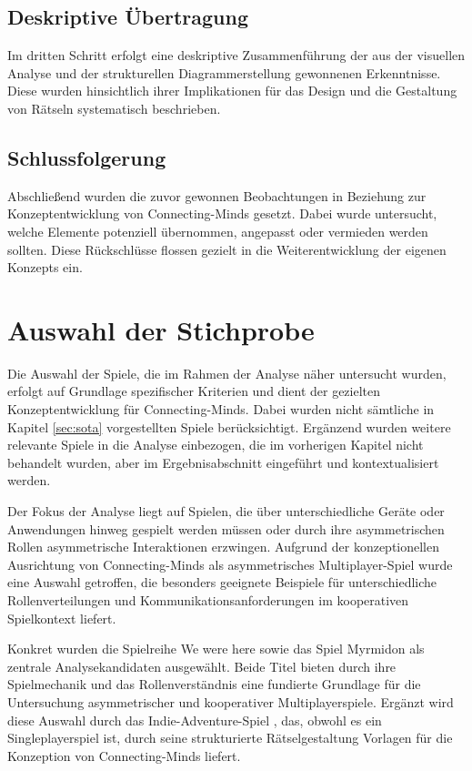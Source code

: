 \subsection{Deskriptive Übertragung}
Im dritten Schritt erfolgt eine deskriptive Zusammenführung der aus der visuellen Analyse und der strukturellen Diagrammerstellung gewonnenen Erkenntnisse. Diese wurden hinsichtlich ihrer Implikationen für das Design und die Gestaltung von Rätseln systematisch beschrieben.

\subsection{Schlussfolgerung}
Abschließend wurden die zuvor gewonnen Beobachtungen in Beziehung zur Konzeptentwicklung von Connecting-Minds gesetzt. Dabei wurde untersucht, welche Elemente potenziell übernommen, angepasst oder vermieden werden sollten. Diese Rückschlüsse flossen gezielt in die Weiterentwicklung der eigenen Konzepts ein.

\section{Auswahl der Stichprobe}
Die Auswahl der Spiele, die im Rahmen der Analyse näher untersucht wurden, erfolgt auf Grundlage spezifischer Kriterien und dient der gezielten Konzeptentwicklung für Connecting-Minds. Dabei wurden nicht sämtliche in Kapitel \ref{sec:sota} vorgestellten Spiele berücksichtigt. Ergänzend wurden weitere relevante Spiele in die Analyse einbezogen, die im vorherigen Kapitel nicht behandelt wurden, aber im Ergebnisabschnitt eingeführt und kontextualisiert werden.

Der Fokus der Analyse liegt auf Spielen, die über unterschiedliche Geräte oder Anwendungen hinweg gespielt werden müssen oder durch ihre asymmetrischen Rollen asymmetrische Interaktionen erzwingen. Aufgrund der konzeptionellen Ausrichtung von Connecting-Minds als asymmetrisches Multiplayer-Spiel wurde eine Auswahl getroffen, die besonders geeignete Beispiele für unterschiedliche Rollenverteilungen und Kommunikationsanforderungen im kooperativen Spielkontext liefert.

Konkret wurden die Spielreihe We were here sowie das Spiel Myrmidon als zentrale Analysekandidaten ausgewählt. Beide Titel bieten durch ihre Spielmechanik und das Rollenverständnis eine fundierte Grundlage für die Untersuchung asymmetrischer und kooperativer Multiplayerspiele. Ergänzt wird diese Auswahl durch das Indie-Adventure-Spiel , das, obwohl es ein Singleplayerspiel ist, durch seine strukturierte Rätselgestaltung Vorlagen für die Konzeption von Connecting-Minds liefert.

